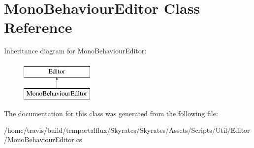 \hypertarget{class_mono_behaviour_editor}{\section{Mono\-Behaviour\-Editor Class Reference}
\label{class_mono_behaviour_editor}
}
Inheritance diagram for Mono\-Behaviour\-Editor\-:\begin{figure}[H]
\begin{center}
\leavevmode
\includegraphics[height=2.000000cm]{class_mono_behaviour_editor}
\end{center}
\end{figure}


The documentation for this class was generated from the following file\-:\begin{DoxyCompactItemize}
\item 
/home/travis/build/temportalflux/\-Skyrates/\-Skyrates/\-Assets/\-Scripts/\-Util/\-Editor/Mono\-Behaviour\-Editor.\-cs\end{DoxyCompactItemize}
